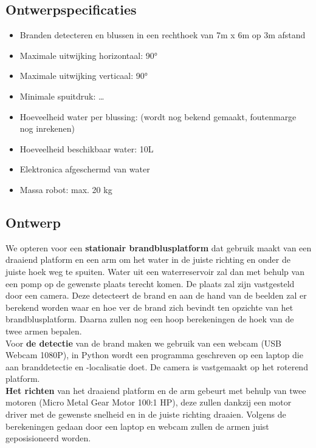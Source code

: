 \documentclass[kulak]{kulakarticle} %
\begin{document}
\subsection{Ontwerpspecificaties}
\begin{itemize}
	\item Branden detecteren en blussen in een rechthoek van 7m x 6m op 3m afstand 
	\item Maximale uitwijking horizontaal: 90°  
	\item Maximale uitwijking verticaal: 90°
	\item Minimale spuitdruk: … 
	\item Hoeveelheid water per blussing: (wordt nog bekend gemaakt, foutenmarge nog inrekenen) 
	\item Hoeveelheid beschikbaar water: 10L 
	\item Elektronica afgeschermd van water 
	\item Massa robot: max. 20 kg
\end{itemize}

\subsection{Ontwerp}
We opteren voor een \textbf{stationair brandblusplatform} dat gebruik maakt van een draaiend platform en een arm om het water in de juiste richting en onder de juiste hoek weg te spuiten. Water uit een waterreservoir zal dan met behulp van een pomp op de gewenste plaats terecht komen. De plaats zal zijn vastgesteld door een camera. Deze detecteert de brand en aan de hand van de beelden zal er berekend worden waar en hoe ver de brand zich bevindt ten opzichte van het brandblusplatform. Daarna zullen nog een hoop berekeningen de hoek van de twee armen bepalen. \\

Voor \textbf{de detectie} van de brand maken we gebruik van een webcam (USB Webcam 1080P), in Python wordt een programma geschreven op een laptop die aan branddetectie en -localisatie doet. De camera is vastgemaakt op het roterend platform. \\

\textbf{Het richten} van het draaiend platform en de arm gebeurt met behulp van twee motoren (Micro Metal Gear Motor 100:1 HP), deze zullen dankzij een motor driver met de gewenste snelheid en in de juiste richting draaien. Volgens de berekeningen gedaan door een laptop en webcam zullen de armen juist geposisioneerd worden. \\
\end{document}
